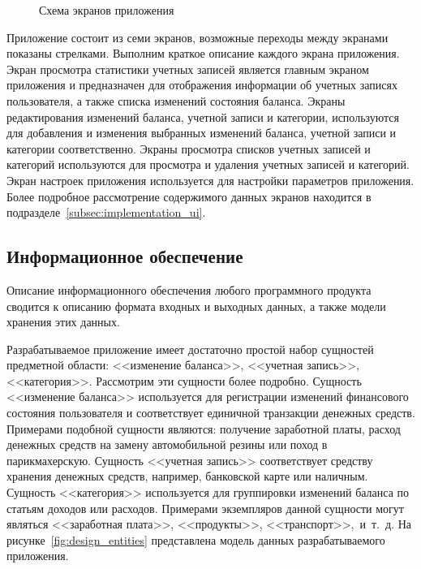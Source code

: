 \begin{figure}[h!]
  \centering
  \caption{Схема экранов приложения}
  \label{fig:design_activities}
\end{figure}

Приложение состоит из семи экранов, возможные переходы между экранами
показаны стрелками. Выполним краткое описание каждого экрана приложения.
Экран просмотра статистики учетных записей является главным экраном приложения
и предназначен для отображения информации об учетных записях пользователя,
а также списка изменений состояния баланса.
Экраны редактирования изменений баланса, учетной записи и категории,
используются для добавления и изменения выбранных изменений баланса,
учетной записи и категории соответственно.
Экраны просмотра списков учетных записей и категорий используются
для просмотра и удаления учетных записей и категорий.
Экран настроек приложения используется для настройки параметров приложения.
Более подробное рассмотрение содержимого данных экранов находится
в подразделе~\ref{subsec:implementation_ui}.

\subsection{Информационное обеспечение}
\label{subsec:design_information}

Описание информационного обеспечения любого программного продукта сводится
к описанию формата входных и выходных данных, а также модели хранения
этих данных.

Разрабатываемое приложение имеет достаточно простой набор сущностей
предметной области: <<изменение баланса>>, <<учетная запись>>, <<категория>>.
Рассмотрим эти сущности более подробно.
Сущность <<изменение баланса>> используется для регистрации изменений
финансового состояния пользователя и соответствует единичной транзакции
денежных средств.
Примерами подобной сущности являются: получение заработной платы,
расход денежных средств на замену автомобильной резины или поход в
парикмахерскую.
Сущность <<учетная запись>> соответствует средству хранения денежных
средств, например, банковской карте или наличным.
Сущность <<категория>> используется для группировки изменений баланса
по статьям доходов или расходов. Примерами экземпляров данной сущности
могут являться <<заработная плата>>, <<продукты>>, <<транспорт>>,~и~т.~д.
На рисунке~\ref{fig:design_entities} представлена модель данных
разрабатываемого приложения.

